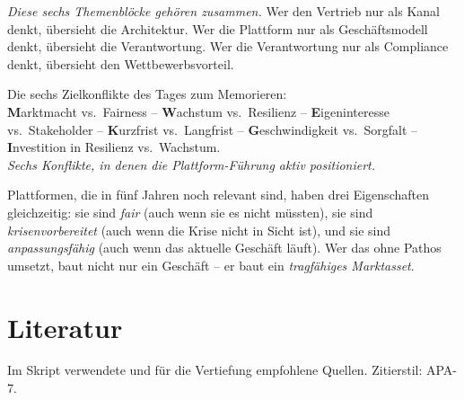 \documentclass[11pt,a4paper,oneside]{article}
\newcommand{\caveatfontfallback}{\itshape}
\newcommand\caveatfont{\caveatfontfallback}%
\newcommand{\akzent}[1]{{\caveatfont\color{lpAmber}#1}}
\begin{document}
\noindent\emph{Diese sechs Themenblöcke gehören zusammen.} Wer den Vertrieb nur als Kanal denkt, übersieht die Architektur. Wer die Plattform nur als Geschäftsmodell denkt, übersieht die Verantwortung. Wer die Verantwortung nur als Compliance denkt, übersieht den Wettbewerbsvorteil.

\begin{eselsbox}[Eselsbrücke: \akzent{M-W-E-K-G-I}]
Die sechs Zielkonflikte des Tages zum Memorieren:\\[2pt]
\textbf{M}arktmacht vs.\ Fairness -- \textbf{W}achstum vs.\ Resilienz -- \textbf{E}igeninteresse vs.\ Stakeholder -- \textbf{K}urzfrist vs.\ Langfrist -- \textbf{G}eschwindigkeit vs.\ Sorgfalt -- \textbf{I}nvestition in Resilienz vs.\ Wachstum.\\[2pt]
\emph{Sechs Konflikte, in denen die Plattform-Führung aktiv positioniert.}
\end{eselsbox}

\begin{merkbox}
Plattformen, die in fünf Jahren noch relevant sind, haben drei Eigenschaften gleichzeitig: sie sind \emph{fair} (auch wenn sie es nicht müssten), sie sind \emph{krisenvorbereitet} (auch wenn die Krise nicht in Sicht ist), und sie sind \emph{anpassungsfähig} (auch wenn das aktuelle Geschäft läuft). Wer das ohne Pathos umsetzt, baut nicht nur ein Geschäft -- er baut ein \emph{tragfähiges Marktasset}.
\end{merkbox}

\clearpage
\section{Literatur}

Im Skript verwendete und für die Vertiefung empfohlene Quellen. Zitierstil: APA-7.
\end{document}
